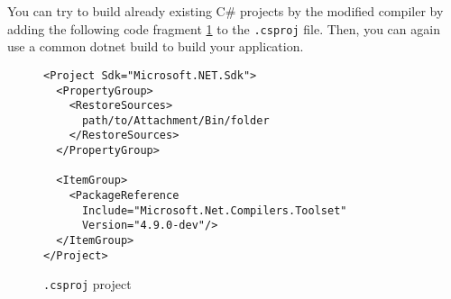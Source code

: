 You can try to build already existing C\# projects by the modified compiler by adding the following code fragment \ref{img81:usage} to the \texttt{.csproj} file. 
Then, you can again use a common dotnet build to build your application.
\begin{figure}[h!]
\begin{lstlisting}
<Project Sdk="Microsoft.NET.Sdk">
  <PropertyGroup>
    <RestoreSources>
      path/to/Attachment/Bin/folder
    </RestoreSources>
  </PropertyGroup>

  <ItemGroup>
    <PackageReference 
      Include="Microsoft.Net.Compilers.Toolset" 
      Version="4.9.0-dev"/>
  </ItemGroup>
</Project>
\end{lstlisting}
\caption{\texttt{.csproj} project}
\label{img81:usage}
\end{figure}